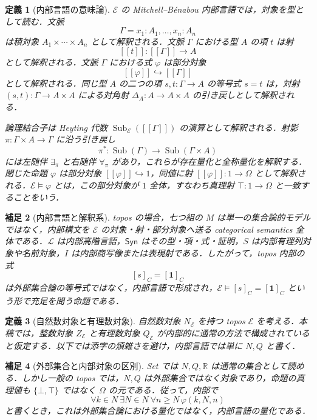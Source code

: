 \documentclass[a4paper,11pt]{ltjsarticle}
\theoremstyle{jpdef}
\newtheorem{definition}{定義}[section]
\newtheorem{remark}[definition]{補足}
\theoremstyle{jpthm}
\newcommand{\R}{\mathbb{R}}
\newcommand{\Lang}{\mathcal L}
\newcommand{\Sub}{\operatorname{Sub}}
\begin{document}
\begin{definition}[内部言語の意味論]
\(\mathcal E\) の Mitchell--B\'enabou 内部言語では，対象を型として読む．文脈
\[
  \Gamma=x_1:A_1,\ldots,x_n:A_n
\]
は積対象 \(A_1\times\cdots\times A_n\) として解釈される．文脈 \(\Gamma\) における型 \(A\) の項 \(t\) は射
\[
  [\![t]\!]:[\![\Gamma]\!]\to A
\]
として解釈される．文脈 \(\Gamma\) における式 \(\varphi\) は部分対象
\[
  [\![\varphi]\!]\hookrightarrow [\![\Gamma]\!]
\]
として解釈される．同じ型 \(A\) の二つの項 \(s,t:\Gamma\to A\) の等号式 \(s=t\) は，対射 \((s,t):\Gamma\to A\times A\) による対角射 \(\Delta_A:A\to A\times A\) の引き戻しとして解釈される．

論理結合子は Heyting 代数 \(\Sub_{\mathcal E}([\![\Gamma]\!])\) の演算として解釈される．射影 \(\pi:\Gamma\times A\to\Gamma\) に沿う引き戻し
\[
  \pi^*:\Sub(\Gamma)\to\Sub(\Gamma\times A)
\]
には左随伴 \(\exists_\pi\) と右随伴 \(\forall_\pi\) があり，これらが存在量化と全称量化を解釈する．閉じた命題 \(\varphi\) は部分対象 \([\![\varphi]\!]\hookrightarrow 1\)，同値に射 \([\![\varphi]\!]:1\to\Omega\) として解釈される．\(\mathcal E\models\varphi\) とは，この部分対象が \(1\) 全体，すなわち真理射 \(\top:1\to\Omega\) と一致することをいう．
\end{definition}

\begin{remark}[内部言語と解釈系]
topos の場合，七つ組の \(M\) は単一の集合論的モデルではなく，内部構文を \(\mathcal E\) の対象・射・部分対象へ送る categorical semantics 全体である．\(\Lang\) は内部高階言語，\(\mathsf{Syn}\) はその型・項・式・証明，\(S\) は内部有理列対象や名前対象，\(I\) は内部商写像または表現射である．したがって，topos 内部の式
\[
  [s]_C=[\mathbf1]_C
\]
は外部集合論の等号式ではなく，内部言語で形成され，\(\mathcal E\models [s]_C=[\mathbf1]_C\) という形で充足を問う命題である．
\end{remark}

\begin{definition}[自然数対象と有理数対象]
自然数対象 \(N_{\mathcal E}\) を持つ topos \(\mathcal E\) を考える．本稿では，整数対象 \(Z_{\mathcal E}\) と有理数対象 \(Q_{\mathcal E}\) が内部的に通常の方法で構成されていると仮定する．以下では添字の煩雑さを避け，内部言語では単に \(N,Q\) と書く．
\end{definition}

\begin{remark}[外部集合と内部対象の区別]
Set では \(N,Q,\R\) は通常の集合として読める．しかし一般の topos では，\(N,Q\) は外部集合ではなく対象であり，命題の真理値も \(\{\bot,\top\}\) ではなく \(\Omega\) の元である．従って，内部で
\[
  \forall k\in N\ \exists N\in N\ \forall n\ge N\,\varphi(k,N,n)
\]
と書くとき，これは外部集合論における量化ではなく，内部言語の量化である．
\end{remark}
\end{document}
